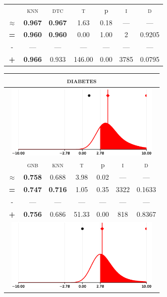 \begin{tabular}{c||cc||c|c|c||c}
\midrule	&\textsc{knn} & \textsc{dtc} & \textsc{t} & p & \textsc{i} & \textsc{d}\\
	\color{black} $\approx$ & \color{black} \bfseries 0.967 &\color{black}  \bfseries 0.967 & 1.63 & 0.18 & --- & ---\\\midrule
	{\bfseries\color{black}\tiny=}& \color{black} \bfseries 0.960 & \color{black} \bfseries 0.960 & 0.00 & 1.00 & 2 & \color{black} 0.9205\\
	{\tiny-}& --- & --- & --- & --- & --- & ---\\
	{\bfseries\color{red}\tiny+}& \color{red} \bfseries 0.966 & \color{red}  0.933 & 146.00 & 0.00 & 3785 & \color{red} 0.0795\\
\bottomrule\end{tabular}


\begin{tabular}{c||cc||c|c|c||c}
	\toprule
	\multicolumn{7}{c}{\textsc{diabetes}}\\
	\bottomrule
	\multicolumn{7}{c}{\includegraphics[width=7.5cm, trim=30 0 30 0]{figures/diabetes_0.eps}}\\

\midrule	&\textsc{gnb} & \textsc{knn} & \textsc{t} & p & \textsc{i} & \textsc{d}\\
	\color{red} $\approx$ & \color{red} \bfseries 0.758 &\color{red}   0.688 & 3.98 & 0.02 & --- & ---\\\midrule
	{\bfseries\color{black}\tiny=}& \color{black} \bfseries 0.747 & \color{black} \bfseries 0.716 & 1.05 & 0.35 & 3322 & \color{black} 0.1633\\
	{\tiny-}& --- & --- & --- & --- & --- & ---\\
	{\bfseries\color{red}\tiny+}& \color{red} \bfseries 0.756 & \color{red}  0.686 & 51.33 & 0.00 & 818 & \color{red} 0.8367\\
	\bottomrule
	\multicolumn{7}{c}{\includegraphics[width=7.5cm, trim=30 0 30 0]{figures/diabetes_1.eps}}\\


\end{tabular}
